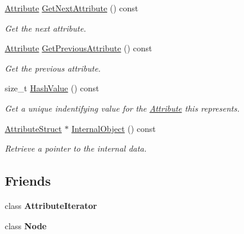\begin{DoxyCompactItemize}
\hyperlink{classphys_1_1xml_1_1Attribute}{Attribute} \hyperlink{classphys_1_1xml_1_1Attribute_a602c51cb79ed0cc33bd898aefe77da70}{GetNextAttribute} () const 
\begin{DoxyCompactList}\small\item\em Get the next attribute. \item\end{DoxyCompactList}\item 
\hyperlink{classphys_1_1xml_1_1Attribute}{Attribute} \hyperlink{classphys_1_1xml_1_1Attribute_ae1c2320961faca954e7e34acc166f8d0}{GetPreviousAttribute} () const 
\begin{DoxyCompactList}\small\item\em Get the previous attribute. \item\end{DoxyCompactList}\item 
size\_\-t \hyperlink{classphys_1_1xml_1_1Attribute_ac0c27e07b705c41670a0903f4fe18378}{HashValue} () const 
\begin{DoxyCompactList}\small\item\em Get a unique indentifying value for the \hyperlink{classphys_1_1xml_1_1Attribute}{Attribute} this represents. \item\end{DoxyCompactList}\item 
\hyperlink{structphys_1_1xml_1_1AttributeStruct}{AttributeStruct} $\ast$ \hyperlink{classphys_1_1xml_1_1Attribute_a1354d5f93309a999651e11b1cd4c2f62}{InternalObject} () const 
\begin{DoxyCompactList}\small\item\em Retrieve a pointer to the internal data. \item\end{DoxyCompactList}\end{DoxyCompactItemize}
\subsection*{Friends}
\begin{DoxyCompactItemize}
\item 
\hypertarget{classphys_1_1xml_1_1Attribute_a1ed8790083a80b2604beba1c666bce6e}{
class {\bfseries AttributeIterator}}
\label{da/ddf/classphys_1_1xml_1_1Attribute_a1ed8790083a80b2604beba1c666bce6e}

\item 
\hypertarget{classphys_1_1xml_1_1Attribute_a6db9d28bd448a131448276ee03de1e6d}{
class {\bfseries Node}}
\label{da/ddf/classphys_1_1xml_1_1Attribute_a6db9d28bd448a131448276ee03de1e6d}

\end{DoxyCompactItemize}



